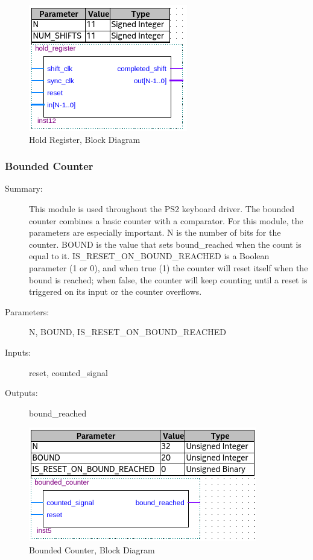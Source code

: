 \documentclass[a4paper]{article}
\begin{document}
        \vspace{.25 in}
        \begin{figure}[h]
          \centering
            \includegraphics[width=.5\textwidth]{Images/silas_blocks/hold_reg_bd.png}
        	\caption{Hold Register, Block Diagram}
            \label{fig:hold_register_bd}
        \end{figure}
    \subsubsection{Bounded Counter}
        \begin{description}
            \item[Summary: ] This module is used throughout the PS2 keyboard driver.  The bounded counter combines a basic counter with a comparator.  For this module, the parameters are especially important.  N is the number of bits for the counter.  BOUND is the value that sets bound\_reached when the count is equal to it.  IS\_RESET\_ON\_BOUND\_REACHED is a Boolean parameter (1 or 0), and when true (1) the counter will reset itself when the bound is reached;  when false, the counter will keep counting until a reset is triggered on its input or the counter overflows.
            \item[Parameters: ] N, BOUND, IS\_RESET\_ON\_BOUND\_REACHED
            \item[Inputs: ] reset, counted\_signal
            \item[Outputs: ] bound\_reached
        \end{description}
        
        \vspace{.25 in}
        \begin{figure}[h]
          \centering
            \includegraphics[width=.5\textwidth]{Images/silas_blocks/bounded_counter_bd.png}
        	\caption{Bounded Counter, Block Diagram}
            \label{fig:bounded_coutner_bd}
        \end{figure}
\end{document}
